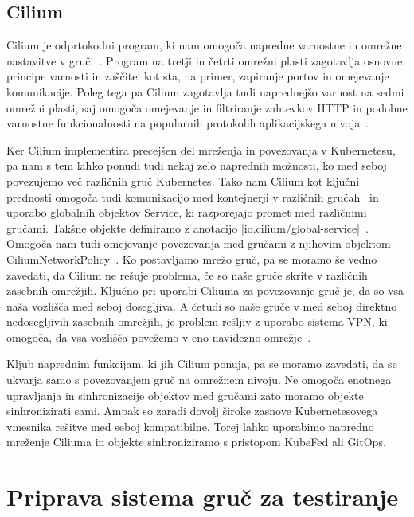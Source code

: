 \documentclass[a4paper, 12pt]{book}
\begin{document}
\section{Cilium}
Cilium je odprtokodni program, ki nam omogoča napredne varnostne in omrežne nastavitve v gruči~\cite{cilium-intro}.
Program na tretji in četrti omrežni plasti zagotavlja osnovne principe varnosti in zaščite, kot sta, na primer, zapiranje portov in omejevanje komunikacije.
Poleg tega pa Cilium zagotavlja tudi naprednejšo varnost na sedmi omrežni plasti, saj omogoča omejevanje in filtriranje zahtevkov HTTP in podobne varnostne funkcionalnosti na popularnih protokolih aplikacijskega nivoja~\cite{cilium-intro}.

Ker Cilium implementira precejšen del mreženja in povezovanja v Kubernetesu, pa nam s tem lahko ponudi tudi nekaj zelo naprednih možnosti, ko med seboj povezujemo več različnih gruč Kubernetes.
Tako nam Cilium kot ključni prednosti omogoča tudi komunikacijo med kontejnerji v različnih gručah~\cite{cilium-cluster-mesh} in uporabo globalnih objektov Service, ki razporejajo promet med različnimi gručami.
Takšne objekte definiramo z anotacijo \spverb|io.cilium/global-service|~\cite{setup-cilium-cluster-mesh}.
Omogoča nam tudi omejevanje povezovanja med gru\-ča\-mi z njihovim objektom CiliumNetworkPolicy~\cite{setup-cilium-cluster-mesh}.
Ko postavljamo mre\-žo gruč, pa se moramo še vedno zavedati, da Cilium ne rešuje problema, če so naše gruče skrite v različnih zasebnih omrežjih.
Ključno pri uporabi Ciliuma za povezovanje gruč je, da so vsa naša vozlišča med seboj dosegljiva.
A četudi so naše gruče v med seboj direktno nedosegljivih zasebnih omrežjih, je problem rešljiv z uporabo sistema VPN, ki omogoča, da vsa vozlišča povežemo v eno navidezno omrežje~\cite{setup-cilium-cluster-mesh}.

Kljub naprednim funkcijam, ki jih Cilium ponuja, pa se moramo zavedati, da se ukvarja samo s povezovanjem gruč na omrežnem nivoju.
Ne omogoča enotnega upravljanja in sinhronizacije objektov med gručami zato moramo objekte sinhronizirati sami.
Ampak so zaradi dovolj široke zasnove Kubernetesovega vmesnika rešitve med seboj kompatibilne.
Torej lahko uporabimo napredno mreženje Ciliuma in objekte sinhroniziramo s pristopom KubeFed ali GitOps.
\chapter{Priprava sistema gruč za testiranje}
\end{document}
